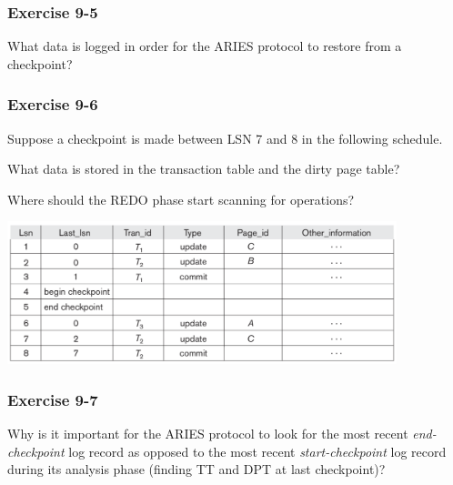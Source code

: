 \begin{frame}
\frametitle{Exercise 9-5}
  What data is logged in order for the ARIES protocol to restore from a checkpoint?
\end{frame}


\begin{frame}
\frametitle{Exercise 9-6}
  Suppose a checkpoint is made between LSN 7 and 8 in the following schedule.

  What data is stored in the transaction table and the dirty page table?

  Where should the REDO phase start scanning for operations?

  \begin{center}
  \includegraphics[width=0.85\textwidth]{images/aries-1}\\
  \end{center}
\end{frame}


\begin{frame}
\frametitle{Exercise 9-7}
  Why is it important for the ARIES protocol to look for the most recent \textit{end-checkpoint} log record as opposed to the most recent \textit{start-checkpoint} log record during its analysis phase (finding TT and DPT at last checkpoint)?
\end{frame}



